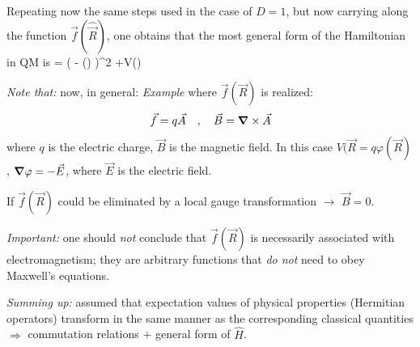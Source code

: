 \documentclass[12pt]{article}
\begin{document}
Repeating now the same steps used in the
case of $D=1$, but now carrying along the
function $\vec{f}(\hat{\vec{R}})$, one obtains that the most
general form of the Hamiltonian in QM is
\be
{} = 
\left(
 - ()
\right)^2
+V()
\ee

\emph{Note that:} now, in general:
\be
{} \neq {}
\ee
\emph{Example} where $\vec{f}(\vec{R})$ is realized:
\[
\vec{f} = q\vec{A}\quad,\quad\vec{B} = \grad\times\vec{A}
\]
where $q$ is the electric charge, $\vec{B}$ is the magnetic field.
In this case $V(\vec{R} = q \varphi(\vec{R})$, $\grad\varphi = -\vec{E}$, where $\vec{E}$ is the electric field.

If $\vec{f}(\vec{R})$  could be eliminated by a local gauge
transformation $\rightarrow$ $\vec{B} = 0$.


\emph{Important:} one should \emph{not} conclude that
$\vec{f}(\vec{R})$ is necessarily associated with electromagnetism;
they are arbitrary functions that \emph{do not} need to
obey Maxwell's equations.


\emph{Summing up:} assumed that expectation values
of physical properties (Hermitian operators) transform
in the same manner as the corresponding classical quantities
$\Rightarrow$ commutation relations + general form of $\hat{H}$.
\end{document}
